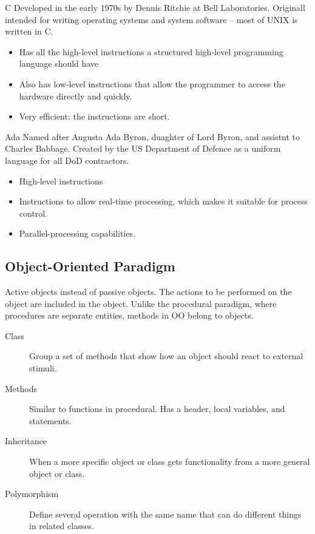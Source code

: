 \documentclass[\main/notes.tex]{subfiles}
\begin{document}
					\begin{definition}{C}
						Developed in the early 1970s by Dennis Ritchie at Bell Laboratories. Originall intended for writing operating systems and system software -- most of UNIX is written in C.
						\begin{itemize}[nosep]
							\item Has all the high-level instructions a structured high-level programming language should have
							\item Also has low-level instructions that allow the programmer to access the hardware directly and quickly.
							\item Very efficient: the instructions are short.
						\end{itemize}
					\end{definition}
					\begin{definition}{Ada}
						Named after Augusta Ada Byron, duaghter of Lord Byron, and assistnt to Charles Babbage. Created by the US Department of Defence as a uniform language for all DoD contractors.
						\begin{itemize}[nosep]
							\item High-level instructions
							\item Instructions to allow real-time processing, which makes it suitable for process control.
							\item Parallel-processing capabilities.
						\end{itemize}
					\end{definition}
			\subsection{Object-Oriented Paradigm}
				Active objects instead of passive objects. The actions to be performed on the object are included in the object. Unlike the procedural paradigm, where procedures are separate entities, methods in OO belong to objects.
				\begin{indentparagraph}
					\begin{description}
						\item[Class] Group a set of methods that show how an object should react to external stimuli.
						\item[Methods] Similar to functions in procedural. Has a header, local variables, and statements.
						\item[Inheritance] When a more specific object or class gets functionality from a more general object or class.
						\item[Polymorphism] Define several operation with the same name that can do different things in related classes.
					\end{description}
				\end{indentparagraph}
\end{document}

